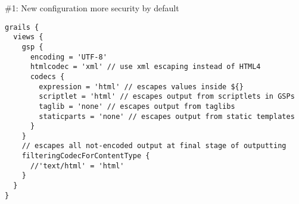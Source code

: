\begin{frame}

    \begin{center}
      \Huge \#1: New configuration more security by default
    \end{center}

    \begin{center}
      \begin{minipage}{1.1\textwidth}
        \begin{verbatim}
grails {
  views {
    gsp {
      encoding = 'UTF-8'
      htmlcodec = 'xml' // use xml escaping instead of HTML4
      codecs {
        expression = 'html' // escapes values inside ${}
        scriptlet = 'html' // escapes output from scriptlets in GSPs
        taglib = 'none' // escapes output from taglibs
        staticparts = 'none' // escapes output from static templates
      }
    }
    // escapes all not-encoded output at final stage of outputting
    filteringCodecForContentType {
      //'text/html' = 'html'
    }
  }
}
        \end{verbatim}
      \end{minipage}
    \end{center}

\end{frame}


